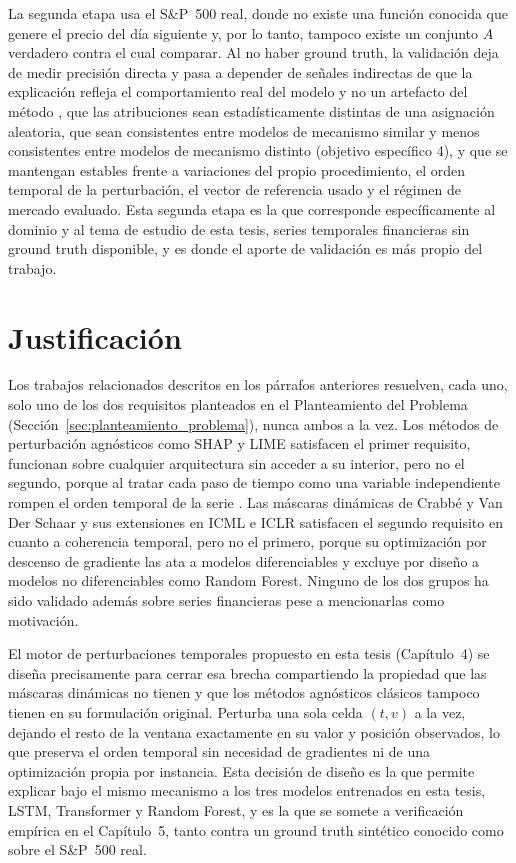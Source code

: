 La segunda etapa usa el S\&P~500 real, donde no existe una función conocida que genere el precio del día siguiente y, por lo tanto, tampoco existe un conjunto $A$ verdadero contra el cual comparar. Al no haber ground truth, la validación deja de medir precisión directa y pasa a depender de señales indirectas de que la explicación refleja el comportamiento real del modelo y no un artefacto del método \cite{adebayo2018}, que las atribuciones sean estadísticamente distintas de una asignación aleatoria, que sean consistentes entre modelos de mecanismo similar y menos consistentes entre modelos de mecanismo distinto (objetivo específico 4), y que se mantengan estables frente a variaciones del propio procedimiento, el orden temporal de la perturbación, el vector de referencia usado y el régimen de mercado evaluado. Esta segunda etapa es la que corresponde específicamente al dominio y al tema de estudio de esta tesis, series temporales financieras sin ground truth disponible, y es donde el aporte de validación es más propio del trabajo.

\section{Justificación}
\label{sec:justificacion}

Los trabajos relacionados descritos en los párrafos anteriores resuelven, cada uno, solo uno de los dos requisitos planteados en el Planteamiento del Problema (Sección~\ref{sec:planteamiento_problema}), nunca ambos a la vez. Los métodos de perturbación agnósticos como SHAP y LIME satisfacen el primer requisito, funcionan sobre cualquier arquitectura sin acceder a su interior, pero no el segundo, porque al tratar cada paso de tiempo como una variable independiente rompen el orden temporal de la serie \cite{tonekaboni2020, huang2025}. Las máscaras dinámicas de Crabbé y Van Der Schaar \cite{crabbe2021} y sus extensiones en ICML \cite{enguehard2023} e ICLR \cite{liu2024contralsp} satisfacen el segundo requisito en cuanto a coherencia temporal, pero no el primero, porque su optimización por descenso de gradiente las ata a modelos diferenciables y excluye por diseño a modelos no diferenciables como Random Forest. Ninguno de los dos grupos ha sido validado además sobre series financieras pese a mencionarlas como motivación.

El motor de perturbaciones temporales propuesto en esta tesis (Capítulo~4) se diseña precisamente para cerrar esa brecha compartiendo la propiedad que las máscaras dinámicas no tienen y que los métodos agnósticos clásicos tampoco tienen en su formulación original. Perturba una sola celda $(t,v)$ a la vez, dejando el resto de la ventana exactamente en su valor y posición observados, lo que preserva el orden temporal sin necesidad de gradientes ni de una optimización propia por instancia. Esta decisión de diseño es la que permite explicar bajo el mismo mecanismo a los tres modelos entrenados en esta tesis, LSTM, Transformer y Random Forest, y es la que se somete a verificación empírica en el Capítulo~5, tanto contra un ground truth sintético conocido como sobre el S\&P~500 real.


